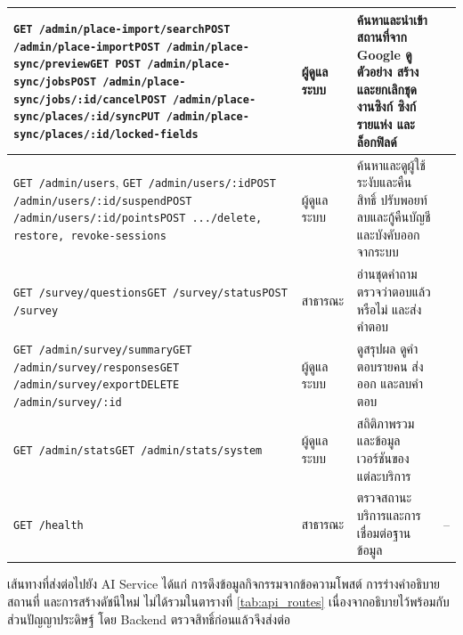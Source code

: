 \begin{longtable}{|>{\raggedright\arraybackslash\footnotesize}p{6.4cm}|>{\raggedright\arraybackslash}p{2.2cm}|>{\raggedright\arraybackslash}p{3.7cm}|>{\raggedright\arraybackslash}p{1.3cm}|}
\texttt{GET /admin/place-import/search}\newline\texttt{POST /admin/place-import}\newline\texttt{POST /admin/place-sync/preview}\newline\texttt{GET POST /admin/place-sync/jobs}\newline\texttt{POST /admin/place-sync/jobs/:id/cancel}\newline\texttt{POST /admin/place-sync/places/:id/sync}\newline\texttt{PUT /admin/place-sync/places/:id/locked-fields} & ผู้ดูแลระบบ & ค้นหาและนำเข้าสถานที่จาก Google ดูตัวอย่าง สร้างและยกเลิกชุดงานซิงก์ ซิงก์รายแห่ง และล็อกฟิลด์ & 22 \\ \hline
\texttt{GET /admin/users}, \texttt{GET /admin/users/:id}\newline\texttt{POST /admin/users/:id/suspend}\newline\texttt{POST /admin/users/:id/points}\newline\texttt{POST .../delete, restore, revoke-sessions} & ผู้ดูแลระบบ & ค้นหาและดูผู้ใช้ ระงับและคืนสิทธิ์ ปรับพอยท์ ลบและกู้คืนบัญชี และบังคับออกจากระบบ & 23 \\ \hline
\texttt{GET /survey/questions}\newline\texttt{GET /survey/status}\newline\texttt{POST /survey} & สาธารณะ & อ่านชุดคำถาม ตรวจว่าตอบแล้วหรือไม่ และส่งคำตอบ & 20 \\ \hline
\texttt{GET /admin/survey/summary}\newline\texttt{GET /admin/survey/responses}\newline\texttt{GET /admin/survey/export}\newline\texttt{DELETE /admin/survey/:id} & ผู้ดูแลระบบ & ดูสรุปผล ดูคำตอบรายคน ส่งออก และลบคำตอบ & 24 \\ \hline
\texttt{GET /admin/stats}\newline\texttt{GET /admin/stats/system} & ผู้ดูแลระบบ & สถิติภาพรวมและข้อมูลเวอร์ชันของแต่ละบริการ & 14 \\ \hline
\texttt{GET /health} & สาธารณะ & ตรวจสถานะบริการและการเชื่อมต่อฐานข้อมูล & -- \\
\hline
\end{longtable}

เส้นทางที่ส่งต่อไปยัง AI Service ได้แก่ การดึงข้อมูลกิจกรรมจากข้อความโพสต์ การร่างคำอธิบายสถานที่ และการสร้างดัชนีใหม่ ไม่ได้รวมในตารางที่ \ref{tab:api_routes} เนื่องจากอธิบายไว้พร้อมกับส่วนปัญญาประดิษฐ์ โดย Backend ตรวจสิทธิ์ก่อนแล้วจึงส่งต่อ

